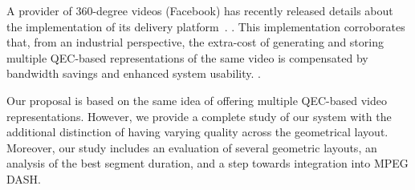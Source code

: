 A  provider of 360-degree videos (Facebook) has recently
released details about the implementation of its delivery
platform~\cite{facebook}.
. This implementation
corroborates that, from an industrial perspective, the extra-cost of
generating and storing multiple \ac{QEC}-based representations of the
same video is compensated by bandwidth savings and
enhanced system usability.
.

Our proposal is based on the same
idea of offering multiple \ac{QEC}-based video representations.
However, we provide a complete study of our system with the additional
distinction of having varying quality across the geometrical layout. Moreover, 
our study includes an evaluation of several
geometric layouts, an analysis of the best segment duration,  
and a step towards integration into MPEG \ac{DASH}.

